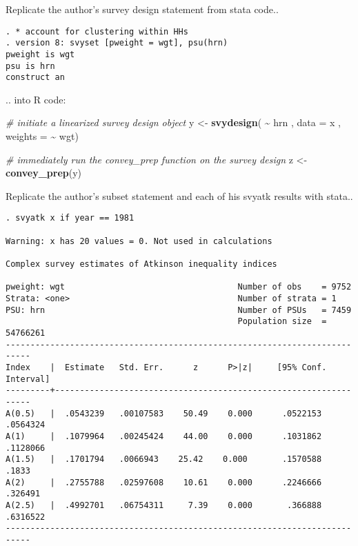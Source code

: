 \documentclass[
]{book}
\newenvironment{Shaded}{\begin{snugshade}}{\end{snugshade}}
\newcommand{\AttributeTok}[1]{\textcolor[rgb]{0.13,0.29,0.53}{#1}}
\newcommand{\CommentTok}[1]{\textcolor[rgb]{0.56,0.35,0.01}{\textit{#1}}}
\newcommand{\FunctionTok}[1]{\textcolor[rgb]{0.13,0.29,0.53}{\textbf{#1}}}
\newcommand{\NormalTok}[1]{#1}
\newcommand{\OtherTok}[1]{\textcolor[rgb]{0.56,0.35,0.01}{#1}}
\newcommand{\SpecialCharTok}[1]{\textcolor[rgb]{0.81,0.36,0.00}{\textbf{#1}}}
\begin{document}
Replicate the author's survey design statement from stata code..

\begin{verbatim}
. * account for clustering within HHs 
. version 8: svyset [pweight = wgt], psu(hrn)
pweight is wgt
psu is hrn
construct an
\end{verbatim}

.. into R code:

\begin{Shaded}
\begin{Highlighting}[]
\CommentTok{\# initiate a linearized survey design object}
\NormalTok{y }\OtherTok{\textless{}{-}} \FunctionTok{svydesign}\NormalTok{( }\SpecialCharTok{\textasciitilde{}}\NormalTok{ hrn , }\AttributeTok{data =}\NormalTok{ x , }\AttributeTok{weights =} \SpecialCharTok{\textasciitilde{}}\NormalTok{ wgt)}

\CommentTok{\# immediately run the \textasciigrave{}convey\_prep\textasciigrave{} function on the survey design}
\NormalTok{z }\OtherTok{\textless{}{-}} \FunctionTok{convey\_prep}\NormalTok{(y)}
\end{Highlighting}
\end{Shaded}

Replicate the author's subset statement and each of his svyatk results with stata..

\begin{verbatim}
. svyatk x if year == 1981
 
Warning: x has 20 values = 0. Not used in calculations

Complex survey estimates of Atkinson inequality indices
 
pweight: wgt                                   Number of obs    = 9752
Strata: <one>                                  Number of strata = 1
PSU: hrn                                       Number of PSUs   = 7459
                                               Population size  = 54766261
---------------------------------------------------------------------------
Index    |  Estimate   Std. Err.      z      P>|z|     [95% Conf. Interval]
---------+-----------------------------------------------------------------
A(0.5)   |  .0543239   .00107583    50.49    0.000      .0522153   .0564324
A(1)     |  .1079964   .00245424    44.00    0.000      .1031862   .1128066
A(1.5)   |  .1701794   .0066943    25.42    0.000       .1570588      .1833
A(2)     |  .2755788   .02597608    10.61    0.000      .2246666    .326491
A(2.5)   |  .4992701   .06754311     7.39    0.000       .366888   .6316522
---------------------------------------------------------------------------
\end{verbatim}
\end{document}
